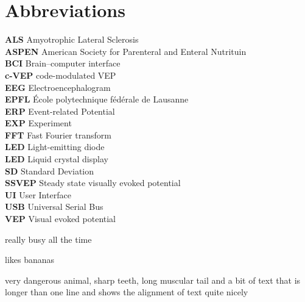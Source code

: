 \chapter{Abbreviations}
\textbf{ALS} Amyotrophic Lateral Sclerosis\\
\textbf{ASPEN}	American Society for Parenteral and Enteral Nutrituin\\
\textbf{BCI}	Brain–computer interface\\
\textbf{c-VEP}	code-modulated VEP\\
\textbf{EEG}	Electroencephalogram\\
\textbf{EPFL}	École polytechnique fédérale de Lausanne\\
\textbf{ERP}	Event-related Potential\\
\textbf{EXP}	Experiment\\
\textbf{FFT}	Fast Fourier transform\\
\textbf{LED}	Light-emitting diode\\
\textbf{LED}	Liquid crystal display\\
\textbf{SD}		Standard Deviation\\
\textbf{SSVEP}	Steady state visually evoked potential\\
\textbf{UI}		User Interface\\
\textbf{USB}		Universal Serial Bus\\
\textbf{VEP}		Visual evoked potential\\
\begin{description}[align=left]
	\item [ant] really busy all the time
	\item [chimp] likes bananas
	\item [alligator] very dangerous animal, sharp teeth, long
	muscular tail and a bit of text that is longer than one
	line and shows the alignment of text quite nicely
\end{description}